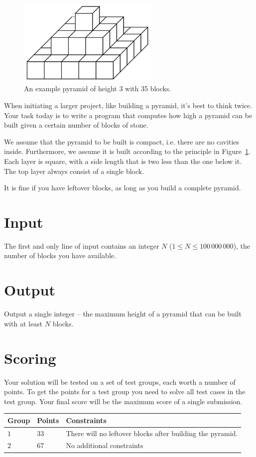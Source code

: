 
\begin{figure}[h!]
\centering
    \includegraphics[width=0.6\textwidth]{pyramid.png}
\caption{An example pyramid of height 3 with 35 blocks.}
\label{fig:pyramid}
\end{figure}

When initiating a larger project, like building a pyramid, it's best to think twice.
Your task today is to write a program that computes how high a pyramid can be built given a certain number of blocks of stone.

We assume that the pyramid to be built is compact, i.e. there are no cavities inside.
Furthermore, we assume it is built according to the principle in Figure~\ref{fig:pyramid}.
Each layer is square, with a side length that is two less than the one below it.
The top layer always consist of a single block.

It is fine if you have leftover blocks, as long as you build a complete pyramid.

\section*{Input}
The first and only line of input contains an integer $N$ ($1 \le N \le 100\,000\,000$), the number of blocks you have available.

\section*{Output}
Output a single integer -- the maximum height of a pyramid that can be built with at least $N$ blocks.

\section*{Scoring}
Your solution will be tested on a set of test groups, each worth a number of points.
To get the points for a test group you need to solve all test cases in the test group. Your final score will be the maximum score of a single submission.

\noindent
\begin{tabular}{| l | l | l |}
  \hline
  Group & Points & Constraints \\ \hline
  $1$    & $33$        &  There will no leftover blocks after building the pyramid. \\ \hline
  $2$    & $67$        &  No additional constraints \\ \hline
\end{tabular}

